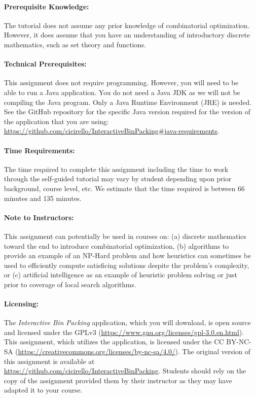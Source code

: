 \documentclass[11pt,letterpaper]{article}
\begin{document}
\paragraph*{Prerequisite Knowledge:} The tutorial does not assume
any prior knowledge of combinatorial optimization. However, it does 
assume that you have an understanding of introductory discrete mathematics,
such as set theory and functions.

\paragraph*{Technical Prerequisites:} This assignment does not require
programming. However, you will need to be able to run a Java application.
You do not need a Java JDK as we will not be compiling the Java program. 
Only a Java Runtime Environment (JRE) is needed. See the GitHub repository
for the specific Java version required for the version of the application
that you are using: \url{https://github.com/cicirello/InteractiveBinPacking#java-requirements}.

\paragraph*{Time Requirements:} The time required to complete this assignment
including the time to work through the self-guided tutorial may vary by
student depending upon prior background, course level, etc. We estimate that
the time required is between 66 minutes and 135 minutes.

\paragraph*{Note to Instructors:} This assignment can potentially be used
in courses on: (a) discrete mathematics toward the end to introduce 
combinatorial optimization, (b) algorithms to provide an example of an
NP-Hard problem and how heuristics can sometimes be used to efficiently
compute satisficing solutions despite the problem's complexity, or (c)
artificial intelligence as an example of heuristic problem solving or
just prior to coverage of local search algorithms.

\paragraph*{Licensing:} The {\em Interactive Bin Packing} application,
which you will download, is open source and licensed under the GPLv3 
(\url{https://www.gnu.org/licenses/gpl-3.0.en.html}). This assignment,
which utilizes the application, is licensed under the CC BY-NC-SA
(\url{https://creativecommons.org/licenses/by-nc-sa/4.0/}). The original
version of this assignment is available 
at \url{https://github.com/cicirello/InteractiveBinPacking}. Students 
should rely on the copy of the assignment provided them by their instructor
as they may have adapted it to your course. 
\end{document}
